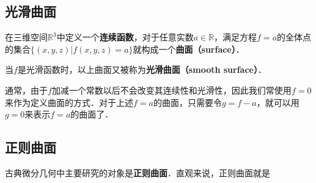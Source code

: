 
\subsection{光滑曲面}

在三维空间$\mathbb{R}^3$中定义一个\textbf{连续函数}，对于任意实数$a\in\mathbb{R}$，满足方程$f=a$的全体点的集合$\{(x, y, z)|f(x, y, z)=a\}$就构成一个\textbf{曲面（surface）}．

当$f$是光滑函数时，以上曲面又被称为\textbf{光滑曲面（smooth surface）}．

通常，由于$f$加减一个常数以后不会改变其连续性和光滑性，因此我们常使用$f=0$来作为定义曲面的方式．对于上述$f=a$的曲面，只需要令$g=f-a$，就可以用$g=0$来表示$f=a$的曲面了．

\subsection{正则曲面}

古典微分几何中主要研究的对象是\textbf{正则曲面}．直观来说，正则曲面就是
